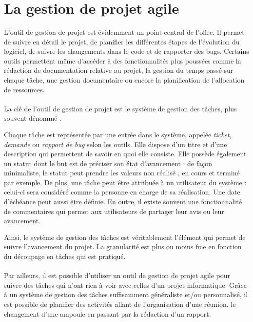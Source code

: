 \section{La gestion de projet agile}

\paragraph{}
L'outil de gestion de projet est évidemment un point central de l'offre.
Il permet de suivre en détail le projet, de planifier les différentes étapes de l'évolution du logiciel, de suivre les changements dans le code et de rapporter des bugs.
Certains outils permettent même d'accéder à des fonctionnalités plus poussées comme la rédaction de documentation relative au projet, la gestion du temps passé sur chaque tâche, une gestion documentaire ou encore la planification de l'allocation de ressources.

\paragraph{}
La clé de l'outil de gestion de projet est le système de gestion des tâches, plus souvent dénommé .

Chaque tâche est représentée par une entrée dans le système, appelée \textit{ticket}, \textit{demande} ou \textit{rapport de bug} selon les outils.
Elle dispose d'un titre et d'une description qui permettent de savoir en quoi elle consiste.
Elle possède également un statut dont le but est de préciser son état d'avancement : de façon minimaliste, le statut peut prendre les valeurs \og non réalisé \fg, \og en cours \fg{} et \og terminé \fg{} par exemple.
De plus, une tâche peut être attribuée à un utilisateur du système : celui-ci sera considéré comme la personne en charge de sa réalisation.
Une date d'échéance peut aussi être définie.
En outre, il existe souvent une fonctionnalité de commentaires qui permet aux utilisateurs de partager leur avis ou leur avancement.

Ainsi, le système de gestion des tâches est véritablement l'élément qui permet de suivre l'avancement du projet.
La granularité est plus ou moins fine en fonction du découpage en tâches qui est pratiqué.

\paragraph{}
Par ailleurs, il est possible d'utiliser un outil de gestion de projet agile pour suivre des tâches qui n'ont rien à voir avec celles d'un projet informatique.
Grâce à un système de gestion des tâches suffisamment généraliste et/ou personnalisé, il est possible de planifier des activités allant de l'organisation d'une réunion, le changement d'une ampoule en passant par la rédaction d'un rapport.


